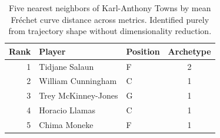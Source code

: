 \begin{table}[htbp]
  \centering\small
  \begin{tabular}{rllc}
    \toprule
    Rank & Player & Position & Archetype \\
    \midrule
    1 & Tidjane Salaun & F & 2 \\
    2 & William Cunningham & C & 1 \\
    3 & Trey McKinney-Jones & G & 1 \\
    4 & Horacio Llamas & C & 1 \\
    5 & Chima Moneke & F & 1 \\
    \bottomrule
  \end{tabular}
  \caption{Five nearest neighbors of Karl-Anthony Towns by mean Fr\'{e}chet curve distance across metrics. Identified purely from trajectory shape without dimensionality reduction.}
  \label{tab:Karl_Anthony_Towns_frechet_curve_neighbors}
\end{table}

